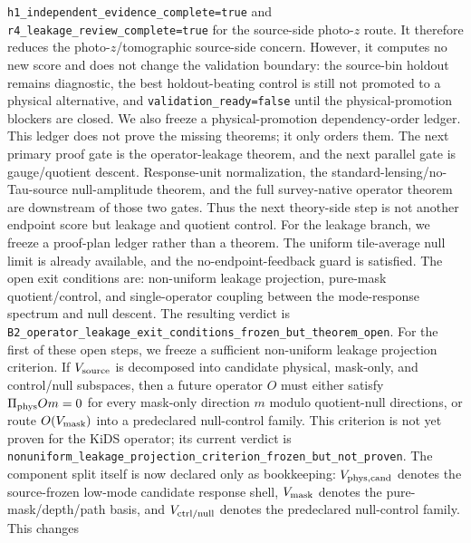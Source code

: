 \documentclass[11pt]{article}
\begin{document}
\texttt{h1\_\allowbreak{}independent\_\allowbreak{}evidence\_\allowbreak{}complete=true} and
\texttt{r4\_\allowbreak{}leakage\_\allowbreak{}review\_\allowbreak{}complete=true} for the source-side photo-\(z\)
route. It therefore reduces the photo-\(z\)/tomographic source-side concern.
However, it computes no new score and does not change the validation boundary:
the source-bin holdout remains diagnostic, the best holdout-beating control is
still not promoted to a physical alternative, and
\texttt{validation\_\allowbreak{}ready=false} until the physical-promotion blockers are
closed.
We also freeze a physical-promotion dependency-order ledger. This ledger does
not prove the missing theorems; it only orders them. The next primary proof gate
is the operator-leakage theorem, and the next parallel gate is gauge/quotient
descent. Response-unit normalization, the standard-lensing/no-Tau-source
null-amplitude theorem, and the full survey-native operator theorem are
downstream of those two gates. Thus the next theory-side step is not another
endpoint score but leakage and quotient control.
For the leakage branch, we freeze a proof-plan ledger rather than a theorem.
The uniform tile-average null limit is already available, and the
no-endpoint-feedback guard is satisfied. The open exit conditions are:
non-uniform leakage projection, pure-mask quotient/control, and single-operator
coupling between the mode-response spectrum and null descent. The resulting
verdict is
\texttt{B2\_\allowbreak{}operator\_\allowbreak{}leakage\_\allowbreak{}exit\_\allowbreak{}conditions\_\allowbreak{}frozen\_\allowbreak{}but\_\allowbreak{}theorem\_\allowbreak{}open}.
For the first of these open steps, we freeze a sufficient non-uniform leakage
projection criterion. If \(V_{\rm source}\) is decomposed into candidate
physical, mask-only, and control/null subspaces, then a future operator \(O\)
must either satisfy \(\Pi_{\rm phys} O m=0\) for every mask-only direction \(m\)
modulo quotient-null directions, or route \(O(V_{\rm mask})\) into a
predeclared null-control family. This criterion is not yet proven for the KiDS
operator; its current verdict is
\texttt{nonuniform\_\allowbreak{}leakage\_\allowbreak{}projection\_\allowbreak{}criterion\_\allowbreak{}frozen\_\allowbreak{}but\_\allowbreak{}not\_\allowbreak{}proven}.
The component split itself is now declared only as bookkeeping:
\(V_{\rm phys,cand}\) denotes the source-frozen low-mode candidate response
shell, \(V_{\rm mask}\) denotes the pure-mask/depth/path basis, and
\(V_{\rm ctrl/null}\) denotes the predeclared null-control family. This changes
\end{document}
